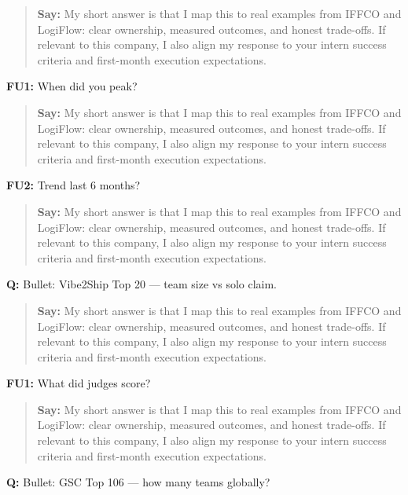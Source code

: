 \documentclass[9pt,a4paper]{article}
\begin{document}
\begin{quote}\small\textbf{Say:} My short answer is that I map this to real examples from IFFCO and LogiFlow: clear ownership, measured outcomes, and honest trade-offs. If relevant to this company, I also align my response to your intern success criteria and first-month execution expectations.\end{quote}
\vspace{2mm}
\textbf{FU1:} When did you peak?

\begin{quote}\small\textbf{Say:} My short answer is that I map this to real examples from IFFCO and LogiFlow: clear ownership, measured outcomes, and honest trade-offs. If relevant to this company, I also align my response to your intern success criteria and first-month execution expectations.\end{quote}
\vspace{2mm}
\textbf{FU2:} Trend last 6 months?

\begin{quote}\small\textbf{Say:} My short answer is that I map this to real examples from IFFCO and LogiFlow: clear ownership, measured outcomes, and honest trade-offs. If relevant to this company, I also align my response to your intern success criteria and first-month execution expectations.\end{quote}
\vspace{2mm}
\textbf{Q:} Bullet: Vibe2Ship Top 20 --- team size vs solo claim.

\begin{quote}\small\textbf{Say:} My short answer is that I map this to real examples from IFFCO and LogiFlow: clear ownership, measured outcomes, and honest trade-offs. If relevant to this company, I also align my response to your intern success criteria and first-month execution expectations.\end{quote}
\vspace{2mm}
\textbf{FU1:} What did judges score?

\begin{quote}\small\textbf{Say:} My short answer is that I map this to real examples from IFFCO and LogiFlow: clear ownership, measured outcomes, and honest trade-offs. If relevant to this company, I also align my response to your intern success criteria and first-month execution expectations.\end{quote}
\vspace{2mm}
\textbf{Q:} Bullet: GSC Top 106 --- how many teams globally?
\end{document}
